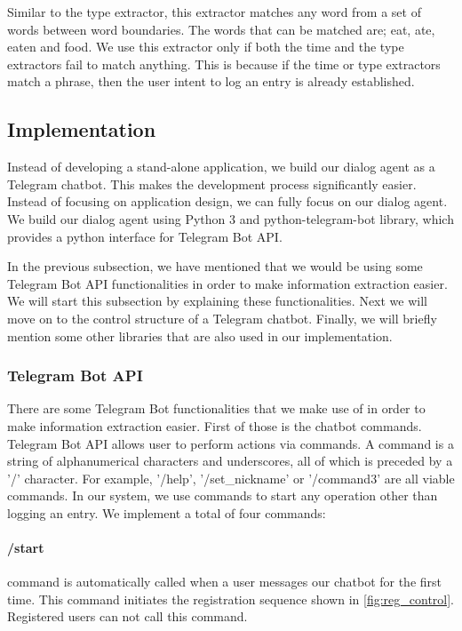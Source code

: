 Similar to the type extractor, this extractor matches any word from a set of words between word boundaries.
The words that can be matched are; eat, ate, eaten and food.
We use this extractor only if both the time and the type extractors fail to match anything.
This is because if the time or type extractors match a phrase, then the user intent to log an entry is already established.

\subsection{Implementation}
Instead of developing a stand-alone application, we build our dialog agent as a Telegram chatbot.
This makes the development process significantly easier.
Instead of focusing on application design, we can fully focus on our dialog agent.
We build our dialog agent using Python 3 and python-telegram-bot library, which provides a python interface for Telegram Bot API.

In the previous subsection, we have mentioned that we would be using some Telegram Bot API functionalities in order to make information extraction easier. 
We will start this subsection by explaining these functionalities.
Next we will move on to the control structure of a Telegram chatbot.
Finally, we will briefly mention some other libraries that are also used in our implementation.
\subsubsection{Telegram Bot API}
There are some Telegram Bot functionalities that we make use of in order to make information extraction easier.
First of those is the chatbot commands.
Telegram Bot API allows user to perform actions via commands.
A command is a string of alphanumerical characters and underscores, all of which is preceded by a '/' character.
For example, '/help', '/set\_nickname' or '/command3' are all viable commands.
In our system, we use commands to start any operation other than logging an entry.
We implement a total of four commands:

\paragraph{/start} command is automatically called when a user messages our chatbot for the first time. This command initiates the registration sequence shown in \autoref{fig:reg_control}. Registered users can not call this command.

